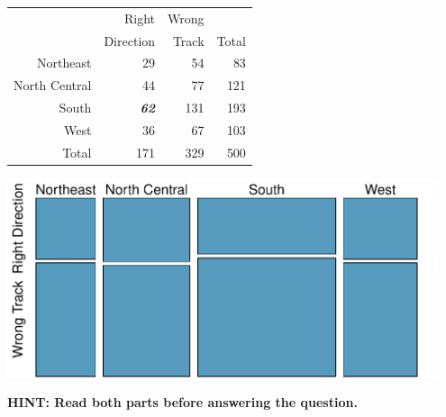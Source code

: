 \documentclass[11pt]{article}
\begin{document}
\begin{minipage}[c]{0.5\textwidth}
\begin{center}
\begin{tabular}{rrr|r}
  \hline
 & Right  & Wrong  &  \\ 
 &  Direction &  Track & Total \\ 
  \hline
Northeast & 29 & 54 & 83 \\ 
  North Central & 44 & 77 & 121 \\ 
  South & \textit{\textbf{62}} & 131 & 193 \\ 
  West & 36 & 67 & 103 \\ 
\hline
  Total & 171 & 329 & 500 \\ 
   \hline
\end{tabular}
\end{center}
\end{minipage}
\begin{minipage}[c]{0.5\textwidth}
\begin{center}
\includegraphics[width=0.95\textwidth]{anes_mosaic}
\end{center}
\end{minipage}

\begin{center}
\textbf{HINT: Read both parts before answering the question.}
\end{center}
\end{document}
